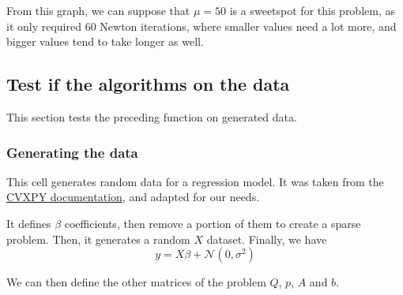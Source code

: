 \documentclass[11pt]{article}
\begin{document}
From this graph, we can suppose that \(\mu=50\) is a sweetspot for this
problem, as it only required 60 Newton iterations, where smaller values
need a lot more, and bigger values tend to take longer as well.

    \hypertarget{test-if-the-algorithms-on-the-data}{%
\subsection{Test if the algorithms on the
data}\label{test-if-the-algorithms-on-the-data}}

This section tests the preceding function on generated data.

    \hypertarget{generating-the-data}{%
\subsubsection{Generating the data}\label{generating-the-data}}

This cell generates random data for a regression model. It was taken
from the
\href{https://www.cvxpy.org/examples/machine_learning/lasso_regression.html}{CVXPY
documentation}, and adapted for our needs.

It defines \(\beta\) coefficients, then remove a portion of them to
create a sparse problem. Then, it generates a random \(X\) dataset.
Finally, we have \[
y = X \beta + \mathcal{N}(0, \sigma^2)
\]

We can then define the other matrices of the problem \(Q\), \(p\), \(A\)
and \(b\).
\end{document}
